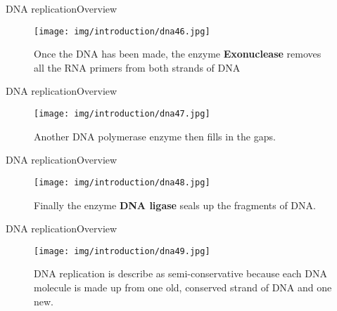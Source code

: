 \documentclass[10pt]{beamer}
\newcommand{\1}{
	\setbeamertemplate{background}{
		\texttt{[image: img/1]}
		\tikz[overlay] \fill[fill opacity=0.75,fill=white] (0,0) rectangle (-\paperwidth,\paperheight);
	}
}
\begin{document}
\begin{frame}{DNA replication}{Overview}
	\begin{figure}[]
		\centering
		\texttt{[image: img/introduction/dna46.jpg]}
		\label{img:mot2}
		\caption{Once the DNA has been made, the enzyme \textbf{Exonuclease} removes all the RNA primers from both strands of DNA }
	\end{figure}
\end{frame}

\begin{frame}{DNA replication}{Overview}
	\begin{figure}[]
		\centering
		\texttt{[image: img/introduction/dna47.jpg]}
		\label{img:mot2}
		\caption{Another DNA polymerase enzyme then fills in the gaps.}
	\end{figure}
\end{frame}


\begin{frame}{DNA replication}{Overview}
	\begin{figure}[]
		\centering
		\texttt{[image: img/introduction/dna48.jpg]}
		\label{img:mot2}
		\caption{Finally the enzyme \textbf{DNA ligase} seals up the fragments of DNA.}
	\end{figure}
\end{frame}

\begin{frame}{DNA replication}{Overview}
	\begin{figure}[]
		\centering
		\texttt{[image: img/introduction/dna49.jpg]}
		\label{img:mot2}
		\caption{DNA replication is describe as semi-conservative because each DNA molecule is made up from one old, conserved strand of DNA and one new.}
	\end{figure}
\end{frame}
\end{document}

